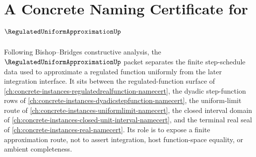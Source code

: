 \chapter{A Concrete Naming Certificate for $\RegulatedUniformApproximationUp$}
\label{ch:concrete-instances-regulated-uniform-approximation-namecert}

Following Bishop--Bridges constructive analysis, the $\RegulatedUniformApproximationUp$ packet separates the finite step-schedule data used to approximate a regulated function uniformly from the later integration interface. It sits between the regulated-function surface of \autoref{ch:concrete-instances-regulatedrealfunction-namecert}, the dyadic step-function rows of \autoref{ch:concrete-instances-dyadicstepfunction-namecert}, the uniform-limit route of \autoref{ch:concrete-instances-uniformlimit-namecert}, the closed interval domain of \autoref{ch:concrete-instances-closed-unit-interval-namecert}, and the terminal real seal of \autoref{ch:concrete-instances-real-namecert}. Its role is to expose a finite approximation route, not to assert integration, host function-space equality, or ambient completeness.

